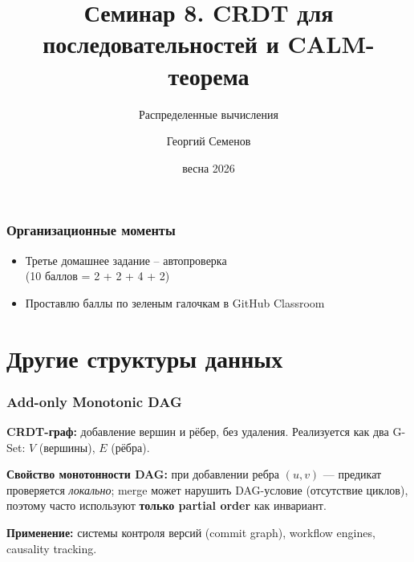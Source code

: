 \documentclass{beamer}
\title{Семинар 8. CRDT для последовательностей и CALM-теорема}
\subtitle{Распределенные вычисления}
\author{Георгий Семенов}
\institute{Институт прикладных компьютерных наук \\ Университет ИТМО}
\date{весна 2026}
\begin{document}
\frame{\titlepage}

\begin{frame}
\frametitle{Организационные моменты}

\begin{itemize}
  \item Третье домашнее задание – автопроверка \\ (10 баллов = 2 + 2 + 4 + 2)
  \item Проставлю баллы по зеленым галочкам в GitHub Classroom
\end{itemize}

\end{frame}

\section{Другие структуры данных}

\begin{frame}
\frametitle{Add-only Monotonic DAG}

\textbf{CRDT-граф:} добавление вершин и рёбер, без удаления. Реализуется как два G-Set: $V$ (вершины), $E$ (рёбра).

\medskip
\textbf{Свойство монотонности DAG:} при добавлении ребра $(u,v)$ — предикат проверяется \emph{локально}; merge может нарушить DAG-условие (отсутствие циклов), поэтому часто используют \textbf{только partial order} как инвариант.

\begin{center}
\end{center}

\textbf{Применение:} системы контроля версий (commit graph), workflow engines, causality tracking.

\end{frame}
\end{document}
